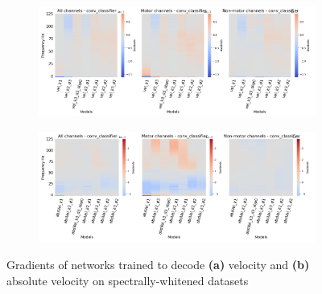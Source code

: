 \begin{figure}[!htbp]
\begin{subfigure}[a]{\textwidth}
   \includegraphics[width=1\linewidth]{img/ch4/vel-pw-last-layer-grads}
   \caption{}
\end{subfigure}\label{fig:vel-pw-last-layer-grads}

\begin{subfigure}[b]{\textwidth}
   \includegraphics[width=1\linewidth]{img/ch4/absVel-pw-last-layer-grads}
   \caption{}
\end{subfigure}\label{fig:absVel-pw-last-layet-grads}
\caption[Spectral whitening - gradients]{Gradients of networks trained to decode \textbf{(a)} velocity and \textbf{(b)} absolute velocity on spectrally-whitened datasets}
\end{figure}\label{fig:pw-last-layer-grads}
